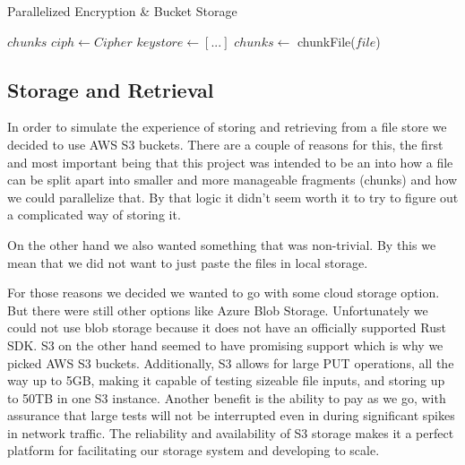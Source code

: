 \documentclass[conference]{IEEEtran}
\begin{document}

\begin{algorithm}
	\caption{Parallelized Encryption \& Bucket Storage}\label{storage}
	\begin{algpsuedocode}
	\Return $chunks$
	\EndProcedure
	\State $ciph\gets Cipher$
	\State $keystore\gets [...]$
	\State $chunks\gets$ chunkFile($file$)
	\end{algpsuedocode}
\end{algorithm}

\subsection{Storage and Retrieval}

In order to simulate the experience of storing and retrieving from a file store we decided to use AWS S3 buckets.
There are a couple of reasons for this, the first and most important being that this project was intended to be an
into how a file can be split apart into smaller and more manageable fragments (chunks) and how we could parallelize that.
By that logic it didn't seem worth it to try to figure out a complicated way of storing it.

On the other hand we also wanted something that was non-trivial.
By this we mean that we did not want to just paste the files in local storage. 

For those reasons we decided we wanted to go with some cloud storage option.
But there were still other options like Azure Blob Storage.
Unfortunately we could not use blob storage because it does not have an officially supported Rust SDK.
S3 on the other hand seemed to have promising support which is why we picked AWS S3 buckets. Additionally, S3 allows for
large PUT operations, all the way up to 5GB, making it capable of testing sizeable file inputs, and storing up to 50TB in 
one S3 instance. Another benefit is the ability to pay as we go, with assurance that large tests will not be interrupted 
even in during significant spikes in network traffic. The reliability and availability of S3 storage makes it a perfect 
platform for facilitating our storage system and developing to scale. 
\end{document}
